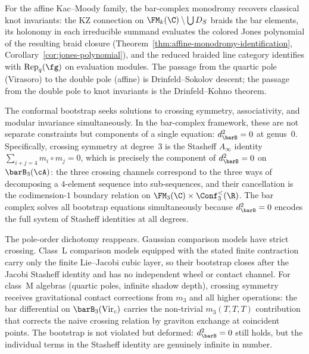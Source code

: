 For the affine Kac--Moody family, the bar-complex monodromy recovers
classical knot invariants: the KZ connection on
$\FM_k(\C) \setminus \bigcup D_S$ braids the bar elements, its
holonomy in each irreducible summand evaluates the colored Jones
polynomial of the resulting braid closure
(Theorem~\ref{thm:affine-monodromy-identification},
Corollary~\ref{cor:jones-polynomial}), and the reduced braided
line category identifies with $\mathrm{Rep}_q(\fg)$ on evaluation
modules. The passage from the quartic pole (Virasoro) to the
double pole (affine) is Drinfeld--Sokolov descent; the passage from
the double pole to knot invariants is the Drinfeld--Kohno theorem.

\begin{remark}
\label{rem:bootstrap-bar-identity}
The conformal bootstrap seeks solutions to crossing
symmetry, associativity, and modular invariance simultaneously. In
the bar-complex framework, these are not separate constraints but
components of a single equation: $d_{\barB}^2 = 0$ at genus~$0$.
Specifically, crossing symmetry at degree~$3$ is the Stasheff
$A_\infty$ identity $\sum_{i+j=4} m_i \circ m_j = 0$, which is
precisely the component of $d_{\barB}^2 = 0$ on
$\barB_3(\cA)$: the three crossing channels correspond to the
three ways of decomposing a $4$-element sequence into
sub-sequences, and their cancellation is the codimension-$1$
boundary relation on $\FM_3(\C) \times \Conf_3^{<}(\R)$. The bar
complex solves all bootstrap equations simultaneously because
$d_{\barB}^2 = 0$ encodes the full system of Stasheff identities at
all degrees.

The pole-order dichotomy reappears. Gaussian comparison models have
strict crossing. Class~L comparison models equipped with the stated
finite contraction carry only the
finite Lie--Jacobi cubic layer, so their bootstrap closes after the
Jacobi Stasheff identity and has no independent wheel or contact
channel. For class~M algebras (quartic poles, infinite shadow depth),
crossing symmetry receives gravitational contact corrections from
$m_3$ and all higher operations: the bar differential on
$\barB_3(\mathrm{Vir}_c)$ carries the non-trivial $m_3(T,T,T)$
contribution that corrects the naive crossing relation by graviton
exchange at coincident points. The bootstrap is not violated but
deformed: $d_{\barB}^2 = 0$ still holds, but the individual terms in
the Stasheff identity are genuinely infinite in number.
\end{remark}

\medskip

